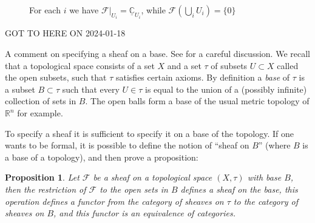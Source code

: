\documentclass[12pt]{article}
\theoremstyle{plain}
\newtheorem{prop}[thm]{Proposition}
\theoremstyle{definition}
\numberwithin{equation}{section}
\newcommand{\C}{\mathbb{C}}
\newcommand{\R}{\mathbb{R}}
\newcommand{\CF}{\mathcal{F}}
\begin{document}
\begin{figure}[htp]
\begin{center}
\end{center}
\caption{For each $i$ we have $\CF|_{U_i} = \underline{\C}_{U_i}$, while $\CF(\bigcup_i U_i) = \{0\}$}
\label{fig:1}
\end{figure}



{\color{red}GOT TO HERE ON 2024-01-18}

A comment on specifying a sheaf on a base. See {\cite[Section 6.30]{stacks-project}} for a careful discussion.
We recall that a topological space consists of a set $X$ and a set $\tau$ of subsets $U \subset X$ called the open subsets, such that $\tau$ satisfies certain axioms. By definition a \emph{base} of $\tau$ is a subset $B \subset \tau$ such that every $U \in \tau$ is equal to the union of a (possibly infinite) collection of sets in $B$. The open balls form a base of the usual metric topology of $\R^n$ for example.

To specify a sheaf it is sufficient to specify it on a base of the topology. If one wants to be formal, it is possible to define the notion of ``sheaf on $B$'' (where $B$ is a base of a topology), and then prove a proposition:
\begin{prop}
Let $\CF$ be a sheaf on a topological space $(X, \tau)$ with base $B$, then the restriction of $\CF$ to the open sets in $B$ defines a sheaf on the base, this operation defines a functor from the category of sheaves on $\tau$ to the category of sheaves on $B$, and this functor is an equivalence of categories.
\end{prop}
\end{document}
